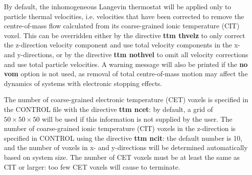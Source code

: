 By default, the inhomogeneous Langevin thermostat will be applied only to 
particle thermal velocities, i.e. velocities that have been corrected to 
remove the centre-of-mass flow calculated from its coarse-grained ionic 
temperature (CIT) voxel. This can be overridden either by the directive 
{\bf ttm thvelz} to only correct the z-direction velocity component and use 
total velocity components in the x- and y-directions, or by the directive 
{\bf ttm nothvel} to omit all velocity corrections and use total particle 
velocities. A warning message will also be printed if the {\bf no vom} option
is not used, as removal of total centre-of-mass motion may affect the 
dynamics of systems with electronic stopping effects.

The number of coarse-grained electronic temperature (CET) voxels is 
specified in the CONTROL file with the directive {\bf ttm ncet}: by default, 
a grid of $50 \times 50 \times 50$ will be used if this information is not 
supplied by the user. The number of coarse-grained ionic temperature (CIT) 
voxels in the z-direction is specified in CONTROL using the directive 
{\bf ttm ncit}: the default number is 10, and the number of voxels in x- 
and y-directions will be determined automatically based on system size. 
The number of CET voxels must be at least the same as CIT or larger: 
too few CET voxels will cause \D to terminate.


